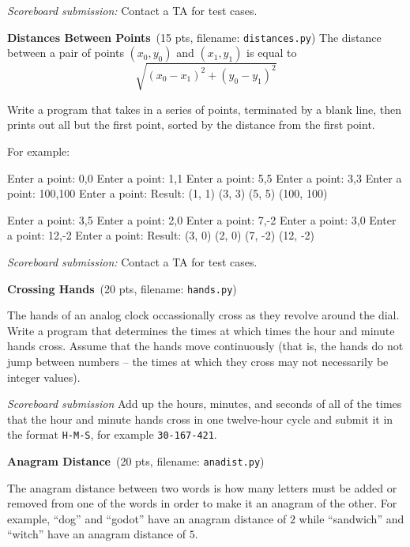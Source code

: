 \documentclass[11pt]{cselabheader}
\newcommand{\cop}[3]{\textbf{#1}~(#2 pts, filename: \texttt{#3})\quad}
\theoremstyle{plain}
\begin{document}
\begin{enumerate}
    \textit{Scoreboard submission:} Contact a TA for test cases.

  \item \cop{Distances Between Points}{15}{distances.py}
    The distance between a pair of points $(x_0, y_0)$ and $(x_1, y_1)$ is
    equal to $$\sqrt{(x_0 - x_1)^2 + (y_0 - y_1)^2}$$
    
    Write a program that takes in a series of points, terminated by a blank
    line, then prints out all but the first point, sorted by the distance from
    the first point.
    
    For example:
    
    \begin{verbatimcode}
Enter a point: 0,0
Enter a point: 1,1
Enter a point: 5,5
Enter a point: 3,3
Enter a point: 100,100
Enter a point:
Result: (1, 1) (3, 3) (5, 5) (100, 100)
    \end{verbatimcode}
    
    \begin{verbatimcode}
Enter a point: 3,5
Enter a point: 2,0
Enter a point: 7,-2
Enter a point: 3,0
Enter a point: 12,-2
Enter a point: 
Result: (3, 0) (2, 0) (7, -2) (12, -2)
    \end{verbatimcode}
    
    \textit{Scoreboard submission:} Contact a TA for test cases.

  \item \cop{Crossing Hands}{20}{hands.py}

    The hands of an analog clock occassionally cross as they revolve around
    the dial. Write a program that determines the times at which times the 
    hour and minute hands cross. Assume that
    the hands move continuously (that is, the hands do not jump between
    numbers -- the times at which they cross may not necessarily be
    integer values).

    \textit{Scoreboard submission} Add up the hours, minutes, and seconds
    of all of the times that the hour and minute hands cross in one
    twelve-hour cycle and submit it in the format \texttt{H-M-S}, 
    for example \texttt{30-167-421}.


  \item \cop{Anagram Distance}{20}{anadist.py}
    
    The anagram distance between two words is how many letters must be added
    or removed from one of the words in order to make it an anagram of the
    other. For example, ``dog'' and ``godot'' have an anagram distance of $2$
    while ``sandwich'' and ``witch'' have an anagram distance of $5$.


\end{enumerate}
\end{document}

